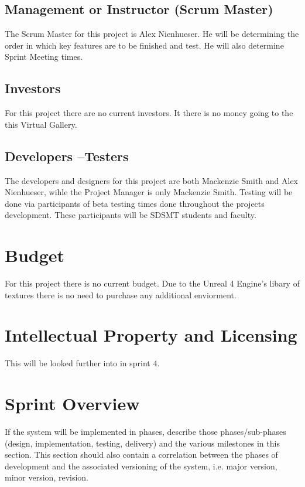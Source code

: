 \subsection{Management or Instructor (Scrum Master)}
The Scrum Master for this project is Alex Nienhueser. He will be determining the order in which key features are to be finished and test. He will also determine Sprint Meeting times. 


\subsection{Investors}
For this project there are no current investors. It there is no money going to the this Virtual Gallery.


\subsection{Developers --Testers}
The developers and designers for this project are both Mackenzie Smith and Alex Nienhueser, wihle the Project Manager is only Mackenzie Smith. Testing will be done via participants of beta testing times done throughout the projects development. These participants will be SDSMT students and faculty. 

\section{Budget}
For this project there is no current budget. Due to the Unreal 4 Engine's libary of textures there is no need to purchase any additional enviorment. 

\section{Intellectual Property and Licensing}
This will be looked further into in sprint 4.

\section{Sprint  Overview}
If the system will be implemented in phases, describe those phases/sub-phases (design, 
implementation, testing, delivery) and the various milestones in this section. 
 This section should also contain a correlation between the phases of development 
and the associated versioning of the system, i.e. major version, minor version, 
revision. 

